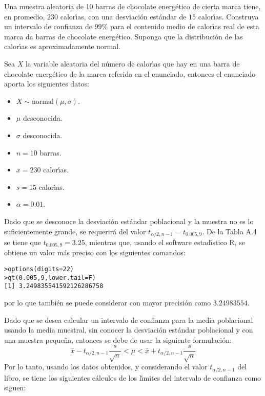 \begin{enunciado}
 Una muestra aleatoria de 10 barras de chocolate energ\'etico de cierta marca tiene, en promedio, $230$ calor\'{\i}as, con una desviaci\'on est\'andar de $15$ calor\'{\i}as. Construya un intervalo de confianza de $99\%$ para el contenido medio de calor\'{\i}as real de esta marca da barras de chocolate energ\'etico. Suponga que la distribuci\'on de las calor\'{\i}as es aproximadamente normal.
\end{enunciado}

\begin{solucion}
 Sea $X$ la variable aleatoria del n\'umero de calor\'{\i}as que hay en una barra de chocolate energ\'etico de la marca referida en el enunciado, entonces el enunciado aporta los siguientes datos:
 \begin{itemize}
  \item $X\sim\text{normal}(\mu, \sigma)$.
  \item $\mu$ desconocida.
  \item $\sigma$ desconocida.
  \item $n = 10$ barras.
  \item $\bar{x} = 230$ calor\'{\i}as.
  \item $s=15$ calor\'{\i}as.
  \item $\alpha=0.01$.
 \end{itemize}
 Dado que se desconoce la desviaci\'on est\'andar poblacional y la muestra no es lo suficientemente grande, se requerir\'a del valor $t_{\alpha/2,n-1} = t_{0.005,9}$. De la Tabla A.4 se tiene que $t_{0.005,9} = 3.25$, mientras que, usando el software estad\'{\i}stico R, se obtiene un valor m\'as preciso con los siguientes comandos:
 \begin{verbatim}
>options(digits=22)
>qt(0.005,9,lower.tail=F)
[1] 3.249835541592126286758
 \end{verbatim}
 \vspace{-0.5cm}
 por lo que tambi\'en se puede considerar con mayor precisi\'on como $3.24983554$.
 \par 
 Dado que se desea calcular un intervalo de confianza para la media poblacional usando la media muestral, sin conocer la desviaci\'on est\'andar poblacional y con una muestra peque\~na, entonces se debe de usar la siguiente formulaci\'on:
 \begin{equation*}
  \bar{x}-t_{\alpha/2,n-1}\frac{s}{\sqrt{n}} < \mu < \bar{x}+t_{\alpha/2,n-1}\frac{s}{\sqrt{n}}
 \end{equation*}
 Por lo tanto, usando los datos obtenidos, y considerando el valor $t_{\alpha/2,n-1}$ del libro, se tiene los siguientes c\'alculos de los l\'{\i}mites del intervalo de confianza como siguen:

\end{solucion}
